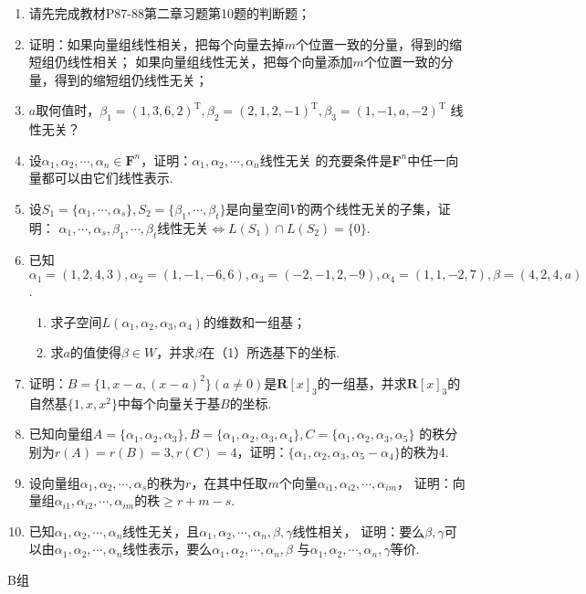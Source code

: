 \begin{enumerate}
    \item 请先完成教材P87-88第二章习题第10题的判断题；
	\item 证明：如果向量组线性相关，把每个向量去掉$m$个位置一致的分量，得到的缩短组仍线性相关；
	如果向量组线性无关，把每个向量添加$m$个位置一致的分量，得到的缩短组仍线性无关；
	\item $a$取何值时，$\beta_1=(1,3,6,2)^\mathrm{T},\beta_2=(2,1,2,-1)^\mathrm{T},\beta_3=(1,-1,a,-2)^\mathrm{T}$
	线性无关？
	\item 设$\alpha_1,\alpha_2,\cdots,\alpha_n\in\mathbf{F}^n$，证明：$\alpha_1,\alpha_2,\cdots,\alpha_n$线性无关
	的充要条件是$\mathbf{F}^n$中任一向量都可以由它们线性表示.
	\item 设$S_1=\{\alpha_1,\cdots,\alpha_s\},S_2=\{\beta_1,\cdots,\beta_t\}$是向量空间$V$的两个线性无关的子集，证明：
	$\alpha_1,\cdots,\alpha_s,\beta_1,\cdots,\beta_t$线性无关$\iff L(S_1)\cap L(S_2)=\{0\}$.
    \item 已知$\alpha_1=(1,2,4,3),\alpha_2=(1,-1,-6,6),\alpha_3=(-2,-1,2,-9),\alpha_4=(1,1,-2,7),\beta=(4,2,4,a)$.
	\begin{enumerate}[label=(\arabic*)]
        \item 求子空间$L(\alpha_1,\alpha_2,\alpha_3,\alpha_4)$的维数和一组基；
        \item 求$a$的值使得$\beta\in W$，并求$\beta$在（1）所选基下的坐标.
    \end{enumerate}
	\item 证明：$B=\{1,x-a,(x-a)^2\}(a\neq 0)$是$\mathbf{R}[x]_3$的一组基，并求$\mathbf{R}[x]_3$的
	自然基$\{1,x,x^2\}$中每个向量关于基$B$的坐标.
	\item 已知向量组$A=\{\alpha_1,\alpha_2,\alpha_3\},B=\{\alpha_1,\alpha_2,\alpha_3,\alpha_4\},C=\{\alpha_1,\alpha_2,\alpha_3,\alpha_5\}$
	的秩分别为$r(A)=r(B)=3,r(C)=4$，证明：$\{\alpha_1,\alpha_2,\alpha_3,\alpha_5-\alpha_4\}$的秩为4.
	\item 设向量组$\alpha_1,\alpha_2,\cdots,\alpha_s$的秩为$r$，在其中任取$m$个向量$\alpha_{i1},\alpha_{i2},\cdots,\alpha_{im}$，
	证明：向量组$\alpha_{i1},\alpha_{i2},\cdots,\alpha_{im}$的秩$\ge r+m-s$.
	\item 已知$\alpha_1,\alpha_2,\cdots,\alpha_n$线性无关，且$\alpha_1,\alpha_2,\cdots,\alpha_n,\beta,\gamma$线性相关，
	证明：要么$\beta,\gamma$可以由$\alpha_1,\alpha_2,\cdots,\alpha_n$线性表示，要么$\alpha_1,\alpha_2,\cdots,\alpha_n,\beta$
	与$\alpha_1,\alpha_2,\cdots,\alpha_n,\gamma$等价.
\end{enumerate}
\centerline{\heiti B组}

